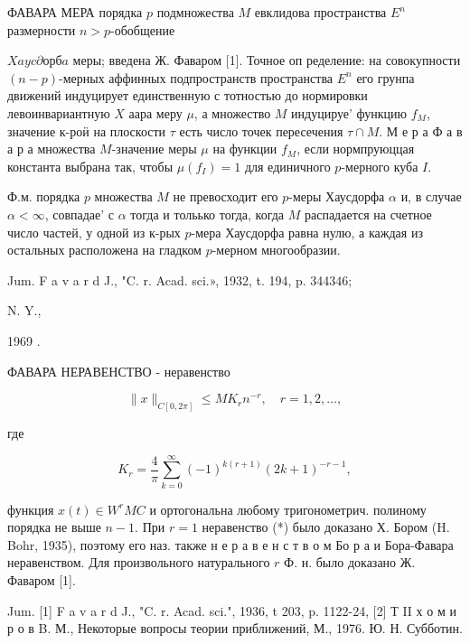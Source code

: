 \documentclass[10pt]{article}
\begin{document}
ФАВАРА МЕРА порядка $p$ подмножества $M$ евклидова пространства $E^{n}$ размерности $n>p$-обобщение

$X a y c \partial о р б a$ меры; введена Ж. Фаваром [1]. Точное оп ределение: на совокупности $(n-p)$-мерных аффинных подпространств пространства $E^{n}$ его грунпа движений индуцирует единственную с тотностью до нормировки левоинвариантную $X$ аара меру $\mu$, а множество $M$ индуцируе' функцию $f_{M}$, значение к-роӥ на плоскости $\tau$ есть число точек пересечения $\tau \cap M$. М е р а Ф а в а р а множества $M$-значение меры $\mu$ на функции $f_{M}$, если нормпруюццая константа выбрана так, чтобы $\mu\left(f_{I}\right)=1$ для единичного $p$-мерного куба $I$.



Ф.м. порядка $p$ множества $M$ не превосходит его $p$-меры Хаусдорфа $\alpha$ и, в случае $\alpha<\infty$, совпадае' с $\alpha$ тогда и тольько тогда, когда $M$ распадается на счетное число частей, у одной из к-рых $p$-мера Хаусдорфа равна нулю, а каждая из остальных расположена на гладком $p$-мерном многообразии.



Jum. F a v a r d J., "C. r. Acad. sci.», 1932, t. 194, p. 344$346 ;$

N. Y.,

1969 .



ФАВАРА НЕРАВЕНСТВО - неравенство



\[

\|x\|_{C[0,2 \pi]} \leqslant M K_{r} n^{-r}, \quad r=1,2, \ldots,

\]



где



\[

K_{r}=\frac{4}{\pi} \sum_{k=0}^{\infty}(-1)^{k(r+1)}(2 k+1)^{-r-1},

\]



функция $x(t) \in W^{r} M C$ и ортогональна любому тригонометрич. полиному порядка не выше $n-1$. При $r=1$ неравенство (*) было доказано Х. Бором (H. Bohr, 1935), поэтому его наз. также н е р а в е н с т в о м Бо р а и Бора-Фавара неравенством. Для произвольного натурального $r$ Ф. н. было доказано Ж. Фаваром [1].



Jum. [1] F a v a r d J., "C. r. Acad. sci.", 1936, t 203, p. 1122-24, [2] Т II х о м и р о в B. М., Некоторые вопросы теории приближений, М., 1976. Ю. Н. Субботин.
\end{document}
